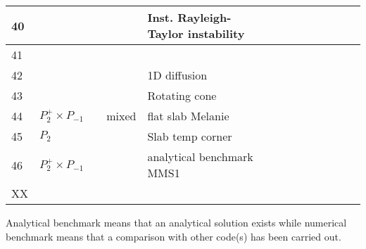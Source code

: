 \begin{landscape}
\begin{tabular}{|p{0.4cm}||p{1.9cm}p{3.6cm}p{1.5cm}p{4.5cm}|p{0.2cm}|p{0.2cm}|p{0.2cm}|p{0.2cm}|p{0.2cm}|p{0.2cm}|p{0.2cm}|p{0.2cm}|}
\hline
40 & & & & Inst. Rayleigh-Taylor instability &&&&&&&& \\
\hline
41 & & & & & &&&&&&& \\
\hline
42 & & & &  1D diffusion &&&&&&&& \\
\hline
43 & & & & Rotating cone &&&&&&&& \\
\hline
44 & $P_2^+\times P_{-1}$ & & mixed  & flat slab Melanie & &&&&&&& \\
\hline
45 & $P_2$ & & & Slab temp corner \cite{vack08} & &&&&&&& \\
\hline
46 & $P_2^+\times P_{-1}$ & & & analytical benchmark MMS1 & & & & & & & & \\
\hline
XX &&&&&&&&&&&& \\
\hline
\end{tabular}

Analytical benchmark means that an analytical solution exists while numerical benchmark
means that a comparison with other code(s) has been carried out.
\end{landscape}


